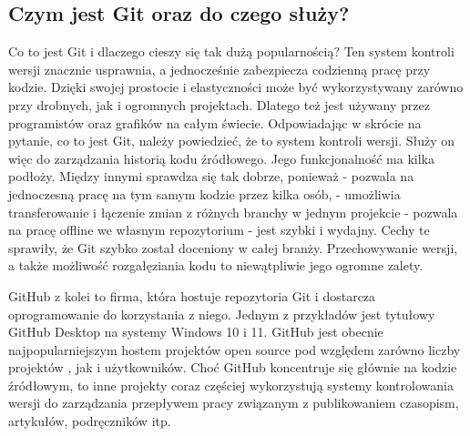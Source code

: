 \subsection{Czym jest Git oraz do czego służy?}
\hspace{0.60cm}Co to jest Git i dlaczego cieszy się tak dużą popularnością? Ten system kontroli wersji znacznie usprawnia, a jednocześnie zabezpiecza codzienną pracę przy kodzie. Dzięki swojej prostocie i elastyczności może być wykorzystywany zarówno przy drobnych, jak i ogromnych projektach. Dlatego też jest używany przez programistów oraz grafików na całym świecie. Odpowiadając w skrócie na pytanie, co to jest Git, należy powiedzieć, że to system kontroli wersji. Służy on więc do zarządzania historią kodu źródłowego. Jego funkcjonalność ma kilka podłoży. Między innymi sprawdza się tak dobrze, ponieważ\newline
- pozwala na jednoczesną pracę na tym samym kodzie przez kilka osób, \newline
- umożliwia transferowanie i łączenie zmian z różnych branchy w jednym projekcie\newline
- pozwala na pracę offline we własnym repozytorium \newline
- jest szybki i wydajny.\newline 
Cechy te sprawiły, że Git szybko został doceniony w całej branży. Przechowywanie wersji, a także możliwość rozgałęziania kodu to niewątpliwie jego ogromne zalety. 
\newline

GitHub z kolei to firma, która hostuje repozytoria Git i dostarcza oprogramowanie do korzystania z niego. Jednym z przykładów jest tytułowy GitHub Desktop na systemy Windows 10 i 11. GitHub jest obecnie najpopularniejszym hostem projektów open source pod względem zarówno liczby projektów , jak i użytkowników. Choć GitHub koncentruje się głównie na kodzie źródłowym, to inne projekty coraz częściej wykorzystują systemy kontrolowania wersji do zarządzania przepływem pracy związanym z publikowaniem czasopism, artykułów, podręczników itp.\newline

